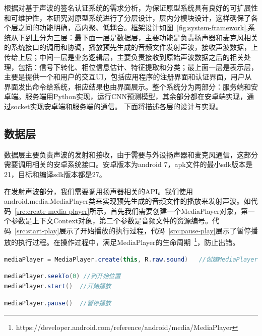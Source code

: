 根据对基于声波的签名认证系统的需求分析，为保证原型系统具有良好的可扩展性和可维护性，本研究对原型系统进行了分层设计，层内分模块设计，这样确保了各个层之间的功能明确，高内聚、低耦合。框架设计如图~\ref{fig:system-framework},系统从下到上分为三层：最下面一层是数据层，主要功能是负责扬声器和麦克风相关的系统接口的调用和协调，播放预先生成的音频文件发射声波，接收声波数据，上传给上层；中间一层是业务逻辑层，主要负责接收到原始声波数据之后的相关处理，包括：信号下转化、相位信息估计、特征提取和分类；最上面一层是表示层，主要是提供一个和用户的交互UI，包括应用程序的注册界面和认证界面，用户从界面发出命令给系统，相应结果也由界面展示。整个系统分为两部分：服务端和安卓端。服务端用Python实现，运行CNN预测模型，其余部分都在安卓端实现，通过socket实现安卓端和服务端的通信。 下面将描述各层的设计与实现。


\subsection{数据层}
数据层主要负责声波的发射和接收，由于需要与外设扬声器和麦克风通信，这部分需要调用相关的安卓系统接口。安卓版本为android 7，apk文件的最小sdk版本是21，目标和编译sdk版本都是27。

在发射声波部分，我们需要调用扬声器相关的API。我们使用android.media.MediaPlayer类来实现预先生成的音频文件的播放来发射声波。如代码~\ref{src:create-media-player}所示，首先我们需要创建一个MediaPlayer对象，第一个参数是上下文Context对象，第二个参数是音频文件的资源编号。代码~\ref{src:start-play}展示了开始播放的执行过程，代码~\ref{src:pause-play}展示了暂停播放的执行过程。在操作过程中，满足MediaPlayer的生命周期~\footnote{https://developer.android.com/reference/android/media/MediaPlayer}，防止出错。
\begin{lstlisting}[language={Java}, caption={创建MediaPlayer对象 \label{src:create-media-player}}]
mediaPlayer = MediaPlayer.create(this, R.raw.sound)   //创建MediaPlayer对象
\end{lstlisting}

\begin{lstlisting}[language={Java}, caption={开始播放 \label{src:start-play}}]
mediaPlayer.seekTo(0) //到开始位置
mediaPlayer.start()  //开始播放
\end{lstlisting}

\begin{lstlisting}[language={Java}, caption={暂停播放\label{src:pause-play}} ]
mediaPlayer.pause()  //暂停播放
\end{lstlisting}

